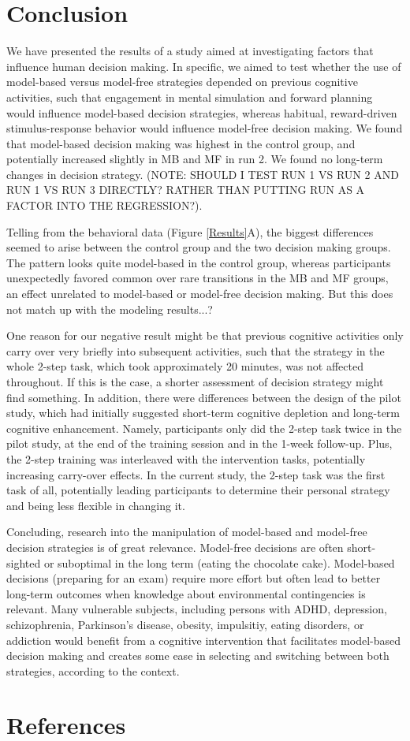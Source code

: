 \documentclass[11pt]{article} %
\begin{document}
\section{Conclusion}
We have presented the results of a study aimed at investigating factors that influence human decision making. In specific, we aimed to test whether the use of model-based versus model-free strategies depended on previous cognitive activities, such that engagement in mental simulation and forward planning would influence model-based decision strategies, whereas habitual, reward-driven stimulus-response behavior would influence model-free decision making. We found that model-based decision making was highest in the control group, and potentially increased slightly in MB and MF in run 2. We found no long-term changes in decision strategy. (NOTE: SHOULD I TEST RUN 1 VS RUN 2 AND RUN 1 VS RUN 3 DIRECTLY? RATHER THAN PUTTING RUN AS A FACTOR INTO THE REGRESSION?).

Telling from the behavioral data (Figure \ref{Results}A), the biggest differences seemed to arise between the control group and the two decision making groups. The pattern looks quite model-based in the control group, whereas participants unexpectedly favored common over rare transitions in the MB and MF groups, an effect unrelated to model-based or model-free decision making. But this does not match up with the modeling results...?

One reason for our negative result might be that previous cognitive activities only carry over very briefly into subsequent activities, such that the strategy in the whole 2-step task, which took approximately 20 minutes, was not affected throughout. If this is the case, a shorter assessment of decision strategy might find something. In addition, there were differences between the design of the pilot study, which had initially suggested short-term cognitive depletion and long-term cognitive enhancement. Namely, participants only did the 2-step task twice in the pilot study, at the end of the training session and in the 1-week follow-up. Plus, the 2-step training was interleaved with the intervention tasks, potentially increasing carry-over effects. In the current study, the 2-step task was the first task of all, potentially leading participants to determine their personal strategy and being less flexible in changing it.

Concluding, research into the manipulation of model-based and model-free decision strategies is of great relevance. Model-free decisions are often short-sighted or suboptimal in the long term (eating the chocolate cake). Model-based decisions (preparing for an exam) require more effort but often lead to better long-term outcomes when knowledge about environmental contingencies is relevant. Many vulnerable subjects, including persons with ADHD, depression, schizophrenia, Parkinson's disease, obesity, impulsitiy, eating disorders, or addiction would benefit from a cognitive intervention that facilitates model-based decision making and creates some ease in selecting and switching between both strategies, according to the context.

\section{References}
\end{document}
